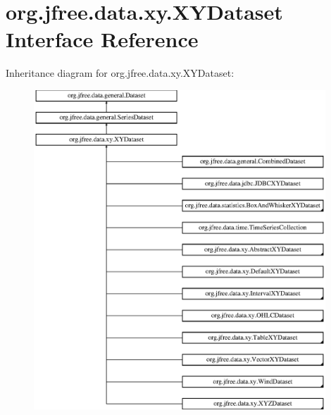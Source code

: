 \hypertarget{interfaceorg_1_1jfree_1_1data_1_1xy_1_1_x_y_dataset}{}\section{org.\+jfree.\+data.\+xy.\+X\+Y\+Dataset Interface Reference}
\label{interfaceorg_1_1jfree_1_1data_1_1xy_1_1_x_y_dataset}
Inheritance diagram for org.\+jfree.\+data.\+xy.\+X\+Y\+Dataset\+:\begin{figure}[H]
\begin{center}
\leavevmode
\includegraphics[height=12.000000cm]{interfaceorg_1_1jfree_1_1data_1_1xy_1_1_x_y_dataset}
\end{center}
\end{figure}
